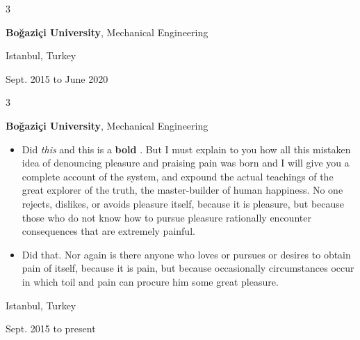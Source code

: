 \documentclass[10pt, letterpaper]{article}
\newenvironment{highlights}{
    \begin{itemize}[
        topsep=0.10 cm,
        parsep=0.10 cm,
        partopsep=0pt,
        itemsep=0pt,
        leftmargin=0.4 cm + 10pt
    ]
}{
    \end{itemize}
} %
\newenvironment{threecolentry}[3][]{
    \onecolentry
    \def\thirdColumn{#3}
    \setcolumnwidth{1 cm, \fill, 4.5 cm}
    \begin{paracol}{3}
    {\raggedright #2} \switchcolumn
}{
    \switchcolumn \raggedleft \thirdColumn
    \end{paracol}
    \endonecolentry
} %
\let\hrefWithoutArrow\href
\renewcommand{\href}[2]{\hrefWithoutArrow{#1}{\mbox{\ifthenelse{\equal{#2}{}}{ }{#2 }\raisebox{.15ex}{\footnotesize \faExternalLink*}}}}
\begin{document}
        \vspace{0.2 cm}

        \begin{threecolentry}{\textbf{}}{
            Istanbul, Turkey

        Sept. 2015 to June 2020
        }
            \textbf{Boğaziçi University}, Mechanical Engineering
        \end{threecolentry}

        \vspace{0.2 cm}

        \begin{threecolentry}{\textbf{}}{
            Istanbul, Turkey

        Sept. 2015 to present
        }
            \textbf{Boğaziçi University}, Mechanical Engineering
            \begin{highlights}
                \item Did \textit{this} and this is a \textbf{bold} \href{https://example.com}{link}. But I must explain to you how all this mistaken idea of denouncing pleasure and praising pain was born and I will give you a complete account of the system, and expound the actual teachings of the great explorer of the truth, the master-builder of human happiness. No one rejects, dislikes, or avoids pleasure itself, because it is pleasure, but because those who do not know how to pursue pleasure rationally encounter consequences that are extremely painful.
                \item Did that. Nor again is there anyone who loves or pursues or desires to obtain pain of itself, because it is pain, but because occasionally circumstances occur in which toil and pain can procure him some great pleasure.
            \end{highlights}
        \end{threecolentry}

        \vspace{0.2 cm}
\end{document}
